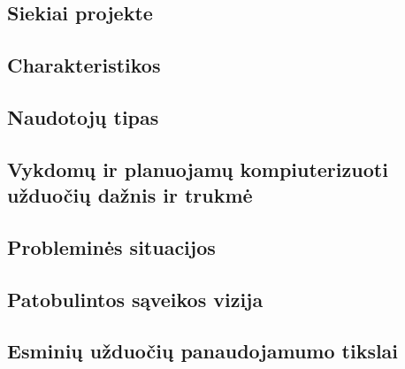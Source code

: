\subsection{Siekiai projekte}
\subsection{Charakteristikos}
\subsection{Naudotojų tipas}
\subsection{Vykdomų ir planuojamų kompiuterizuoti užduočių dažnis ir trukmė}
\subsection{Probleminės situacijos}
\subsection{Patobulintos sąveikos vizija}
\subsection{Esminių užduočių panaudojamumo tikslai}

